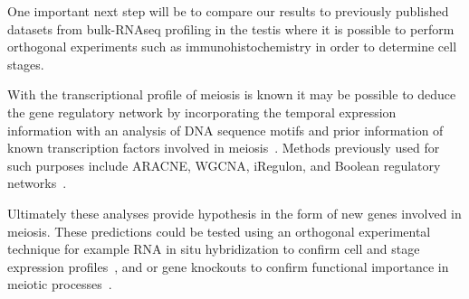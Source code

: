 

One important next step will be to compare our results to previously published datasets from bulk-RNAseq profiling in the testis where it is possible to perform orthogonal experiments such as immunohistochemistry in order to determine cell stages.


With the transcriptional profile of meiosis is known it may be possible to deduce the gene regulatory network by incorporating the temporal expression information with an analysis of DNA sequence motifs and prior information of known transcription factors involved in meiosis~\cite{PadovanMerhar2013Using, Goutsias2007Computational}. Methods previously used for such purposes include ARACNE, WGCNA, iRegulon, and Boolean regulatory networks~\cite{Margolin2006Reverse, Zhang2005General, Janky2014IRegulon, Moignard2013Characterization}.

Ultimately these analyses provide hypothesis in the form of new genes involved in meiosis. These predictions could be tested using an orthogonal experimental technique for example RNA in situ hybridization to confirm cell and stage expression profiles~\cite{Moffitt2016Highperformance,Choi2016Mapping}, and or gene knockouts to confirm functional importance in meiotic processes~\cite{Jamsai2010Mouse}.
